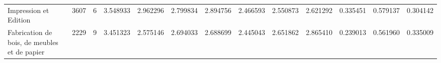\begin{tabular}{lrrrrrrrrrrrr}
Impression et Edition                              &          3607 &              6 &     3.548933 &              2.962296 &            2.799834 &                 2.894756 &               2.466593 &                  2.550873 &                   2.621292 &                   0.335451 &  0.579137 &             0.304142 \\
Fabrication de bois, de meubles et de papier       &          2229 &              9 &     3.451323 &              2.575146 &            2.694033 &                 2.688699 &               2.445043 &                  2.651862 &                   2.865410 &                   0.239013 &  0.561960 &             0.335009 \\
\bottomrule
\end{tabular}

